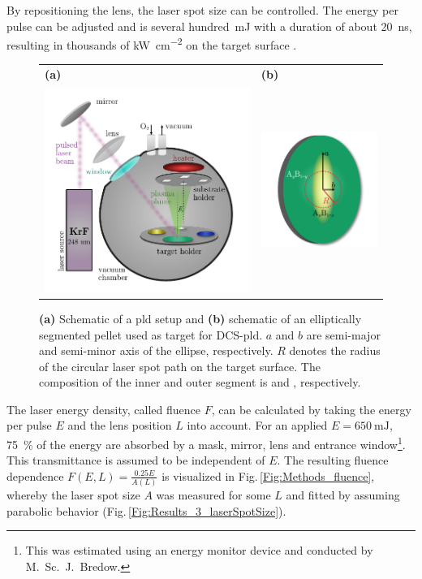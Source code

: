 By repositioning the lens, the laser spot size can be controlled.
The energy per pulse can be adjusted and is several hundred~\unit{\mJ} with a duration of about \qty{20}{\ns}, resulting in thousands of \unit{\kW\per\square\cm} on the target surface
    \cite{lorenz2019}.
\begin{figure}
    \centering
    \begin{tabular}{ll}
        \textbf{(a)}&\textbf{(b)}\\
        \includegraphics[width=9cm,align=c]{fastImages/PLD.pdf}&
        \includegraphics[width=5cm,align=c]{fastImages/target.pdf}  
    \end{tabular}
    \caption{\textbf{(a)} Schematic of a \gls{pld} setup and \textbf{(b)} schematic of an elliptically segmented pellet used as target for \acrshort{DCS}-\gls{pld}.
    $a$ and $b$ are semi-major and semi-minor axis of the ellipse, respectively.
    $R$ denotes the radius of the circular laser spot path on the target surface.
    The composition of the inner and outer segment is  and , respectively.}
    \label{Fig:Methods_pld}
\end{figure}

The laser energy density, called fluence $F$, can be calculated by taking the energy per pulse $E$ and the lens position $L$ into account.
For an applied $E=\qty{650}{\milli\joule}$, \qty{75}{\percent} of the energy are absorbed by a mask, mirror, lens and entrance window\footnote{
    This was estimated using an energy monitor device and conducted by M.\ Sc.\ J.\ Bredow.}.
This transmittance is assumed to be independent of $E$.
The resulting fluence dependence $F(E,L)=\frac{0.25E}{A(L)}$ is visualized in Fig.\,\ref{Fig:Methods_fluence}, whereby the laser spot size $A$ was measured for some $L$ and fitted by assuming parabolic behavior (Fig.\,\ref{Fig:Results_3_laserSpotSize}).

